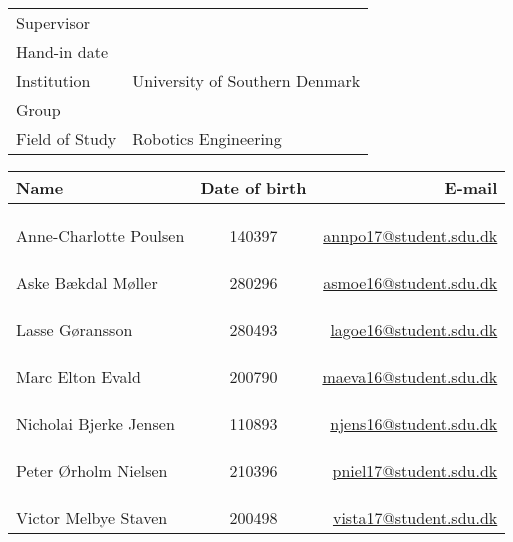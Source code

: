 \documentclass[../main.tex]{subfiles}
\begin{document}
\phantom{g}
\vspace{0.5cm}
\noindent
\begin{center}
\begin{Huge}
\textbf{\titel}
\end{Huge}
\\
\begin{huge}
\subtitel
\end{huge}
\\
\vspace{1cm}



\vspace{.7cm}

\begin{tabular}{@{} l l @{}}
\hline
Supervisor         		&	\vejleder          	\\
Hand-in date 			& 	\dato				\\
Institution             	&   	University of Southern Denmark	\\
Group                  		&	\gruppe				\\
Field of Study           	& 	Robotics Engineering	\\
\hline
\end{tabular}
\thispagestyle{empty}

\vspace{1.5cm}


\newcommand{\fmedlem}[3]{%
\multicolumn{3}{c}{}\\
\multicolumn{3}{c}{}\\
\multicolumn{3}{c}{}\\
\hline
#1 & #2 & 	\href{mailto:#3@student.sdu.dk}{#3@student.sdu.dk}\\
}

\begin{tabular}{ l  c  r }

Name						& Date of birth &	E-mail \\
\hline
\fmedlem{Anne-Charlotte Poulsen}{140397}{annpo17}
\fmedlem{Aske Bækdal Møller}{280296}{asmoe16}
\fmedlem{Lasse Gøransson}{280493}{lagoe16}
\fmedlem{Marc Elton Evald}{200790}{maeva16}
\fmedlem{Nicholai Bjerke Jensen}{110893}{njens16}
\fmedlem{Peter Ørholm Nielsen}{210396}{pniel17}
\fmedlem{Victor Melbye Staven}{200498}{vista17}
\end{tabular}
\end{center}
\end{document}
